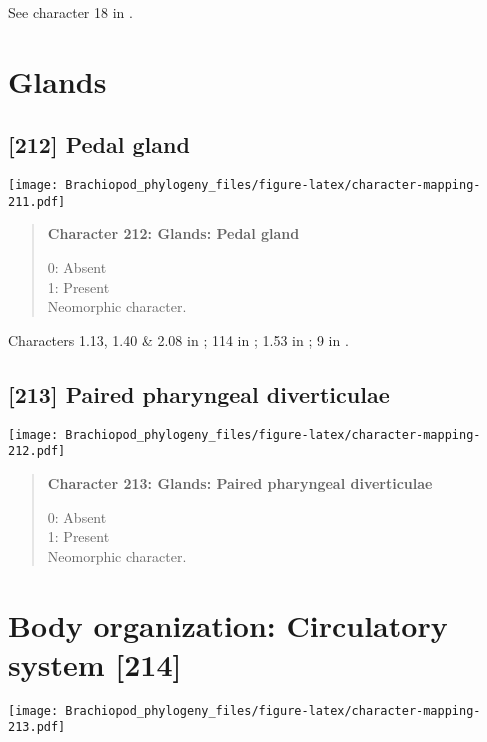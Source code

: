 \documentclass[openany]{book}
\theoremstyle{definition}
\theoremstyle{definition}
\theoremstyle{definition}
\theoremstyle{remark}
\begin{document}
See character 18 in \citet{Haszprunar1996}.

\section{Glands}\label{glands-1}

\subsection*{{[}212{]} Pedal gland}\label{pedal-gland-1}

\texttt{[image: Brachiopod\_phylogeny\_files/figure-latex/character-mapping-211.pdf]}

\begin{quote}
\textbf{Character 212: Glands: Pedal gland}

0: Absent\\
1: Present\\
Neomorphic character.
\end{quote}

Characters 1.13, 1.40 \& 2.08 in \citet{Scheltema1993}; 114 in
\citet{Giribet2002}; 1.53 in \citet{SPS1996}; 9 in
\citet{Haszprunar1996}.

\subsection*{{[}213{]} Paired pharyngeal
diverticulae}\label{paired-pharyngeal-diverticulae}

\texttt{[image: Brachiopod\_phylogeny\_files/figure-latex/character-mapping-212.pdf]}

\begin{quote}
\textbf{Character 213: Glands: Paired pharyngeal diverticulae}

0: Absent\\
1: Present\\
Neomorphic character.
\end{quote}

\section{Body organization: Circulatory system
{[}214{]}}\label{body-organization-circulatory-system-214}

\texttt{[image: Brachiopod\_phylogeny\_files/figure-latex/character-mapping-213.pdf]}
\end{document}
